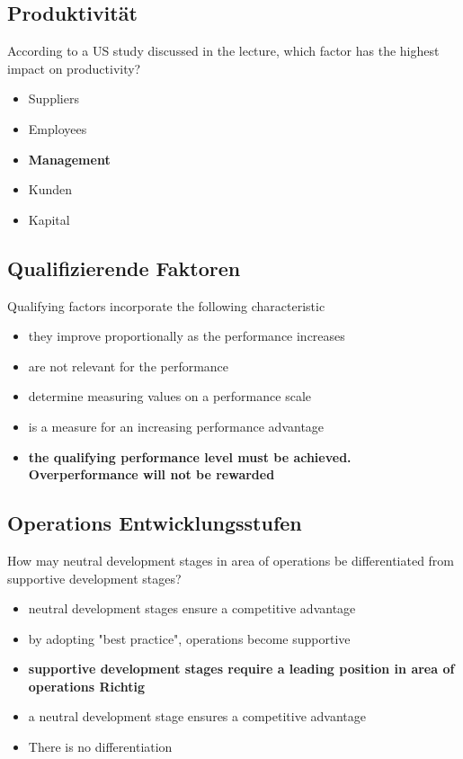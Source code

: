 \subsection{Produktivit\"at}
According to a US study discussed in the lecture, which factor has the highest impact on productivity?\\
\begin{itemize}
\item Suppliers
\item Employees
\item \textbf{Management} 
\item Kunden
\item Kapital
\end{itemize}
\subsection{Qualifizierende Faktoren}
Qualifying factors incorporate the following characteristic\\
\begin{itemize}
\item they improve proportionally as the performance increases
\item are not relevant for the performance
\item determine measuring values on a performance scale
\item is a measure for an increasing performance advantage
\item \textbf{the qualifying performance level must be achieved. Overperformance will not be rewarded}
\end{itemize}
\subsection{Operations Entwicklungsstufen}
How may neutral development stages in area of operations be differentiated from supportive development stages?
\begin{itemize}
\item neutral development stages ensure a competitive advantage
\item by adopting "best practice", operations become supportive
\item  \textbf{supportive development stages require a leading position in area of operations Richtig}
\item  a neutral development stage ensures a competitive advantage
\item  There is no differentiation
\end{itemize}
